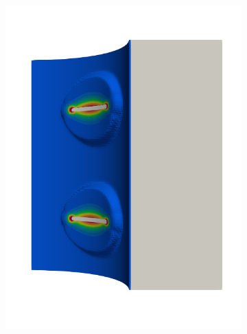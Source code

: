 \begin{frame}
\begin{columns}[T]
\begin{column}{0.6\textwidth}
\begin{figure}
{\begin{subfigure}{0.19\textwidth}
            \includegraphics[width=\textwidth]{examples/figures/seed_ep_5}
          \end{subfigure}
        }
        

\end{figure}
\end{column}
\end{columns}
\end{frame}
